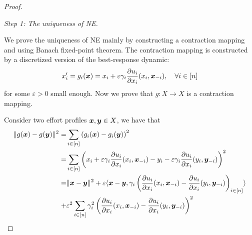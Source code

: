 \begin{proof}
\label{prf:lem:near-potential}

\emph{Step 1: The uniqueness of NE.}

We prove the uniqueness of NE mainly by constructing a contraction mapping and using Banach fixed-point theorem.
The contraction mapping is constructed by a discretized version of the best-response dynamic:
\begin{align*}
    x'_i = g_i({\bm{x}}) = x_i + \varepsilon \gamma_i \frac{\partial u_i}{\partial x_i}(x_i, {\bm{x}}_{-i}),\quad \forall {i\in[n]}
\end{align*}
for some $\varepsilon > 0$ small enough. Now we prove that $g: X \to X$ is a contraction mapping.

Consider two effort profiles ${\bm{x}}, {\bm{y}} \in X$, we have that
\begin{align*}
    \| g({\bm{x}}) - g({\bm{y}}) \|^2 =& \sum_{i\in[n]} \left( g_i({\bm{x}}) - g_i({\bm{y}}) \right)^2
    \\
    =& \sum_{i\in[n]} \left( x_i + \varepsilon\gamma_i \frac{\partial u_i}{\partial x_i}(x_i, {\bm{x}}_{-i}) - y_i - \varepsilon\gamma_i \frac{\partial u_i}{\partial x_i}(y_i, {\bm{y}}_{-i}) \right)^2
    \\
    =& \| {\bm{x}} - {\bm{y}} \|^2 + \varepsilon \langle {\bm{x}} - {\bm{y}}, \gamma_i\left(\frac{\partial u_i}{\partial x_i}(x_i,{\bm{x}}_{-i}) - \frac{\partial u_i}{\partial x_i}(y_i,{\bm{y}}_{-i})\right)_{i\in[n]}\rangle
    \\
    +& \varepsilon^2 \sum_{i\in[n]}\gamma_i^2 \left( \frac{\partial u_i}{\partial x_i}(x_i,{\bm{x}}_{-i}) - \frac{\partial u_i}{\partial x_i}(y_i,{\bm{y}}_{-i}) \right)^2
\end{align*}


\end{proof}
